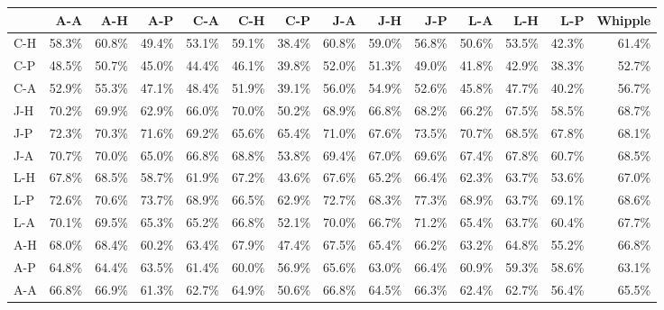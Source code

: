\begin{tabular}{lrrrrrrrrrrrrr}
\toprule
{} &   A-A &   A-H &   A-P &   C-A &   C-H &   C-P &   J-A &   J-H &   J-P &   L-A &   L-H &   L-P &  Whipple \\
\midrule
C-H & 58.3\% & 60.8\% & 49.4\% & 53.1\% & 59.1\% & 38.4\% & 60.8\% & 59.0\% & 56.8\% & 50.6\% & 53.5\% & 42.3\% &    61.4\% \\
C-P & 48.5\% & 50.7\% & 45.0\% & 44.4\% & 46.1\% & 39.8\% & 52.0\% & 51.3\% & 49.0\% & 41.8\% & 42.9\% & 38.3\% &    52.7\% \\
C-A & 52.9\% & 55.3\% & 47.1\% & 48.4\% & 51.9\% & 39.1\% & 56.0\% & 54.9\% & 52.6\% & 45.8\% & 47.7\% & 40.2\% &    56.7\% \\
J-H & 70.2\% & 69.9\% & 62.9\% & 66.0\% & 70.0\% & 50.2\% & 68.9\% & 66.8\% & 68.2\% & 66.2\% & 67.5\% & 58.5\% &    68.7\% \\
J-P & 72.3\% & 70.3\% & 71.6\% & 69.2\% & 65.6\% & 65.4\% & 71.0\% & 67.6\% & 73.5\% & 70.7\% & 68.5\% & 67.8\% &    68.1\% \\
J-A & 70.7\% & 70.0\% & 65.0\% & 66.8\% & 68.8\% & 53.8\% & 69.4\% & 67.0\% & 69.6\% & 67.4\% & 67.8\% & 60.7\% &    68.5\% \\
L-H & 67.8\% & 68.5\% & 58.7\% & 61.9\% & 67.2\% & 43.6\% & 67.6\% & 65.2\% & 66.4\% & 62.3\% & 63.7\% & 53.6\% &    67.0\% \\
L-P & 72.6\% & 70.6\% & 73.7\% & 68.9\% & 66.5\% & 62.9\% & 72.7\% & 68.3\% & 77.3\% & 68.9\% & 63.7\% & 69.1\% &    68.6\% \\
L-A & 70.1\% & 69.5\% & 65.3\% & 65.2\% & 66.8\% & 52.1\% & 70.0\% & 66.7\% & 71.2\% & 65.4\% & 63.7\% & 60.4\% &    67.7\% \\
A-H & 68.0\% & 68.4\% & 60.2\% & 63.4\% & 67.9\% & 47.4\% & 67.5\% & 65.4\% & 66.2\% & 63.2\% & 64.8\% & 55.2\% &    66.8\% \\
A-P & 64.8\% & 64.4\% & 63.5\% & 61.4\% & 60.0\% & 56.9\% & 65.6\% & 63.0\% & 66.4\% & 60.9\% & 59.3\% & 58.6\% &    63.1\% \\
A-A & 66.8\% & 66.9\% & 61.3\% & 62.7\% & 64.9\% & 50.6\% & 66.8\% & 64.5\% & 66.3\% & 62.4\% & 62.7\% & 56.4\% &    65.5\% \\
\bottomrule
\end{tabular}
